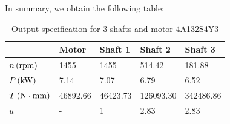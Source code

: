 In summary, we obtain the following table:
\begin{table}[ht]
	\centering
	\caption{Output specification for 3 shafts and motor 4A132S4Y3}
	\begin{tabular}{lllll}\toprule
		&Motor    & Shaft 1  & Shaft 2  & Shaft 3   \\\midrule
		$ n \, (\mathrm{rpm})$ & 1455 & 1455  & 514.42 & 181.88 \\
		$ P \, (\mathrm{kW})$ & 7.14  & 7.07   & 6.79   & 6.52   \\
		$ T \, (\mathrm{N\cdot mm})$ & 46892.66 & 46423.73 & 126093.30 & 342486.86\\
		$ u $ &       -   &1    &  2.83  & 2.83            \\
		\bottomrule
	\end{tabular}
	\label{tab:my-table}
\end{table}